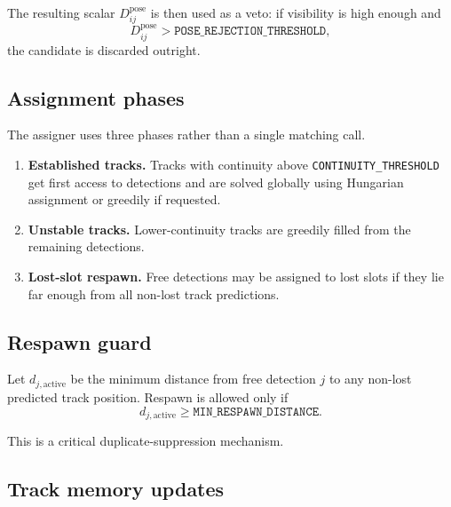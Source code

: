 \documentclass[11pt]{article}
\newcommand{\runtimekey}[1]{\texttt{#1}}
\begin{document}
The resulting scalar $D^{\text{pose}}_{ij}$ is then used as a veto: if visibility is high enough and
\begin{equation}
  D^{\text{pose}}_{ij} >
  \runtimekey{POSE\_REJECTION\_THRESHOLD},
\end{equation}
the candidate is discarded outright.

\subsection{Assignment phases}

The assigner uses three phases rather than a single matching call.

\begin{enumerate}
  \item \textbf{Established tracks.} Tracks with continuity above \runtimekey{CONTINUITY\_THRESHOLD} get first access to detections and are solved globally using Hungarian assignment or greedily if requested.
  \item \textbf{Unstable tracks.} Lower-continuity tracks are greedily filled from the remaining detections.
  \item \textbf{Lost-slot respawn.} Free detections may be assigned to lost slots if they lie far enough from all non-lost track predictions.
\end{enumerate}

\begin{center}
  \resizebox{\linewidth}{!}{}
  \label{fig:lifecycle}
\end{center}

\subsection{Respawn guard}

Let $d_{j,\text{active}}$ be the minimum distance from free detection $j$ to any non-lost predicted track position. Respawn is allowed only if
\begin{equation}
  d_{j,\text{active}} \geq \runtimekey{MIN\_RESPAWN\_DISTANCE}.
\end{equation}

This is a critical duplicate-suppression mechanism.

\subsection{Track memory updates}
\end{document}
